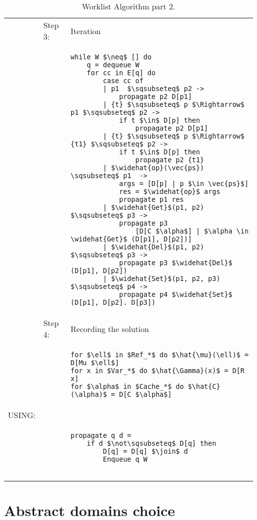 \begin{table}[htb]
\small
\begin{center}
\begin{tabular}{l l l}
&Step 3: & Iteration\\
&&
\begin{lstlisting}[mathescape]
while W $\neq$ [] do
    q = dequeue W
    for cc in E[q] do
        case cc of
        | p1  $\sqsubseteq$ p2 -> 
            propagate p2 D[p1]
        | {t} $\sqsubseteq$ p $\Rightarrow$ p1 $\sqsubseteq$ p2 -> 
            if t $\in$ D[p] then
                propagate p2 D[p1]
        | {t} $\sqsubseteq$ p $\Rightarrow$ {t1} $\sqsubseteq$ p2 ->
            if t $\in$ D[p] then
                propagate p2 {t1}
        | $\widehat{op}(\vec{ps}) \sqsubseteq$ p1  -> 
            args = [D[p] | p $\in \vec{ps}$]
            res = $\widehat{op}$ args
            propagate p1 res
        | $\widehat{Get}$(p1, p2) $\sqsubseteq$ p3 -> 
            propagate p3 
                [D[C $\alpha$] | $\alpha \in \widehat{Get}$ (D[p1], D[p2])]
        | $\widehat{Del}$(p1, p2) $\sqsubseteq$ p3 -> 
            propagate p3 $\widehat{Del}$ (D[p1], D[p2]) 
        | $\widehat{Set}$(p1, p2, p3) $\sqsubseteq$ p4 -> 
            propagate p4 $\widehat{Set}$ (D[p1], D[p2]. D[p3]) 
\end{lstlisting}\\
& Step 4: & Recording the solution\\
&&
\begin{lstlisting}[mathescape]
for $\ell$ in $Ref_*$ do $\hat{\mu}(\ell)$ = D[Mu $\ell$]
for x in $Var_*$ do $\hat{\Gamma}(x)$ = D[R x]
for $\alpha$ in $Cache_*$ do $\hat{C}(\alpha)$ = D[C $\alpha$]
\end{lstlisting}\\
USING: \\
&&
\begin{lstlisting}[mathescape]
propagate q d =
    if d $\not\sqsubseteq$ D[q] then
        D[q] = D[q] $\join$ d
        Enqueue q W
    
\end{lstlisting}\\
\end{tabular}
\end{center}
\caption{Worklist Algorithm part 2.}
\label{tab:Worklist2}
\end{table}

\section{Abstract domains choice} %
\label{sec:AbstractDomChoice}


